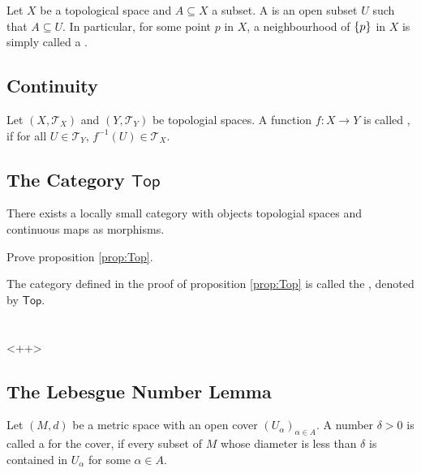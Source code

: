 \begin{definition}[Neighbourhood]
	Let $X$ be a topological space and $A \subseteq X$ a subset. A  is an open subset $U$ such that $A \subseteq U$. In particular, for some point $p$ in $X$, a neighbourhood of $\cbr{p}$ in $X$ is simply called a .
\end{definition}

\subsection*{Continuity}

\begin{definition}[Continuity]
	Let $(X,\mathcal{T}_X)$ and $(Y,\mathcal{T}_Y)$ be topologial spaces. A function $f : X \to Y$ is called , if for all $U \in \mathcal{T}_Y$, $f^{-1}(U) \in \mathcal{T}_X$.  
\end{definition}

\subsection*{The Category $\mathsf{Top}$}

\begin{proposition}
	There exists a locally small category with objects topologial spaces and continuous maps as morphisms.
	\label{prop:Top}
\end{proposition}

\begin{exercise}
	Prove proposition \ref{prop:Top}.
\end{exercise}

\begin{definition}
	The category defined in the proof of proposition \ref{prop:Top} is called the , denoted by $\mathsf{Top}$.
\end{definition}

\section*{}<++>
\subsection*{The Lebesgue Number Lemma}

\begin{definition}
	Let $(M,d)$ be a metric space with an open cover $(U_\alpha)_{\alpha \in A}$. A number $\delta > 0$ is called a  for the cover, if every subset of $M$ whose diameter is less than $\delta$ is contained in $U_\alpha$ for some $\alpha \in A$.
\end{definition}

